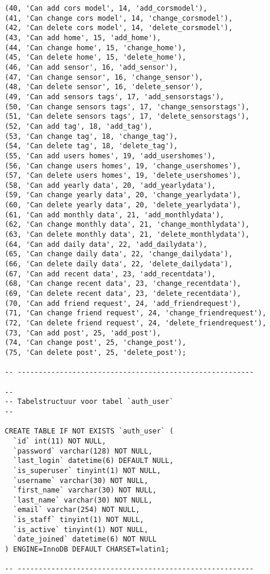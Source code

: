 \documentclass[11pt]{article}
\begin{document}
\begin{lstlisting}[style=SQL]
(40, 'Can add cors model', 14, 'add_corsmodel'),
(41, 'Can change cors model', 14, 'change_corsmodel'),
(42, 'Can delete cors model', 14, 'delete_corsmodel'),
(43, 'Can add home', 15, 'add_home'),
(44, 'Can change home', 15, 'change_home'),
(45, 'Can delete home', 15, 'delete_home'),
(46, 'Can add sensor', 16, 'add_sensor'),
(47, 'Can change sensor', 16, 'change_sensor'),
(48, 'Can delete sensor', 16, 'delete_sensor'),
(49, 'Can add sensors tags', 17, 'add_sensorstags'),
(50, 'Can change sensors tags', 17, 'change_sensorstags'),
(51, 'Can delete sensors tags', 17, 'delete_sensorstags'),
(52, 'Can add tag', 18, 'add_tag'),
(53, 'Can change tag', 18, 'change_tag'),
(54, 'Can delete tag', 18, 'delete_tag'),
(55, 'Can add users homes', 19, 'add_usershomes'),
(56, 'Can change users homes', 19, 'change_usershomes'),
(57, 'Can delete users homes', 19, 'delete_usershomes'),
(58, 'Can add yearly data', 20, 'add_yearlydata'),
(59, 'Can change yearly data', 20, 'change_yearlydata'),
(60, 'Can delete yearly data', 20, 'delete_yearlydata'),
(61, 'Can add monthly data', 21, 'add_monthlydata'),
(62, 'Can change monthly data', 21, 'change_monthlydata'),
(63, 'Can delete monthly data', 21, 'delete_monthlydata'),
(64, 'Can add daily data', 22, 'add_dailydata'),
(65, 'Can change daily data', 22, 'change_dailydata'),
(66, 'Can delete daily data', 22, 'delete_dailydata'),
(67, 'Can add recent data', 23, 'add_recentdata'),
(68, 'Can change recent data', 23, 'change_recentdata'),
(69, 'Can delete recent data', 23, 'delete_recentdata'),
(70, 'Can add friend request', 24, 'add_friendrequest'),
(71, 'Can change friend request', 24, 'change_friendrequest'),
(72, 'Can delete friend request', 24, 'delete_friendrequest'),
(73, 'Can add post', 25, 'add_post'),
(74, 'Can change post', 25, 'change_post'),
(75, 'Can delete post', 25, 'delete_post');

-- --------------------------------------------------------

--
-- Tabelstructuur voor tabel `auth_user`
--

CREATE TABLE IF NOT EXISTS `auth_user` (
  `id` int(11) NOT NULL,
  `password` varchar(128) NOT NULL,
  `last_login` datetime(6) DEFAULT NULL,
  `is_superuser` tinyint(1) NOT NULL,
  `username` varchar(30) NOT NULL,
  `first_name` varchar(30) NOT NULL,
  `last_name` varchar(30) NOT NULL,
  `email` varchar(254) NOT NULL,
  `is_staff` tinyint(1) NOT NULL,
  `is_active` tinyint(1) NOT NULL,
  `date_joined` datetime(6) NOT NULL
) ENGINE=InnoDB DEFAULT CHARSET=latin1;

-- --------------------------------------------------------


\end{lstlisting}
\end{document}
